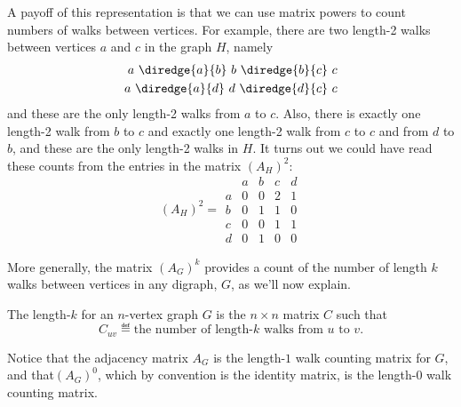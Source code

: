 A payoff of this representation is that we can use matrix powers to
count numbers of walks between vertices.  For example, there are two
length-2 walks between vertices $a$ and $c$ in the graph $H$, namely
\begin{align*}
a\ \diredge{a}{b}\ b\ \diredge{b}{c}\  c\\
a\ \diredge{a}{d}\ d\ \diredge{d}{c}\ c
\end{align*}
and these are the only length-2 walks from $a$ to $c$.  Also, there is
exactly one length-2 walk from $b$ to $c$ and exactly one length-2
walk from $c$ to $c$ and from $d$ to $b$, and these are the only
length-2 walks in $H$.  It turns out we could have read these counts
from the entries in the matrix $(A_H)^2$:
\[
(A_H)^2 = \begin{array}{c|cccc|}
  &  a & b & c & d \\ \hline
a &  0 & 0 & 2 & 1 \\
b &  0 & 1 & 1 & 0 \\
c &  0 & 0 & 1 & 1 \\
d &  0 & 1 & 0 & 0
\end{array}
\]

\iffalse
If $G$ is a weighted graph with edge weights given by $w: E \to
\reals$, then the adjacency matrix for~$G$ is $A_G = \{ a_{ij} \}$
where
\begin{equation*}
    a_{ij} = \begin{cases}
                w(\edge{v_i}{v_j}) & \text{if $\edge{v_i}{v_j} \in E$} \\
                0                 & \text{otherwise.}
              \end{cases}
\end{equation*}
\end{definition}

For example, Figure~\ref{fig:adjacency_matrix} displays the adjacency
matrices for the graphs shown in Figures~\ref{fig:isomorphism}(a)
and~\ref{fig:weighted_graph} where $v_1 = a$, $v_2 = b$, $v_3 = c$,
and $v_4 = d$.
\fi

More generally, the matrix $(A_G)^k$ provides a count of the number of
length $k$ walks between vertices in any digraph, $G$, as we'll now
explain.

\begin{definition}
  The length-$k$  for an $n$-vertex graph $G$
  is the $n \times n$ matrix $C$ such that
\begin{equation}\label{def:walk_matrix}
C_{uv} \eqdef \text{the number of length-$k$ walks from $u$ to $v$}.
\end{equation}
\end{definition}
Notice that the adjacency matrix $A_G$ is the length-$1$ walk counting
matrix for $G$, and that$(A_G)^0$, which by convention is the identity
matrix, is the length-0 walk counting matrix.

